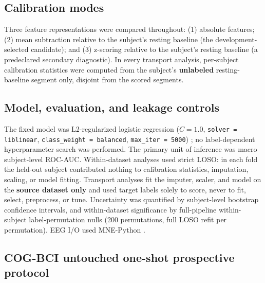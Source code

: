 \documentclass[11pt]{article}
\begin{document}
\subsection{Calibration modes}

Three feature representations were compared throughout: (1) absolute features;
(2) mean subtraction relative to the subject's resting baseline (the
development-selected candidate); and (3) z-scoring relative to the subject's
resting baseline (a predeclared secondary diagnostic). In every transport
analysis, per-subject calibration statistics were computed from the subject's
\textbf{unlabeled} resting-baseline segment only, disjoint from the scored
segments.

\subsection{Model, evaluation, and leakage controls}

The fixed model was L2-regularized logistic regression
($C = 1.0$, \texttt{solver = liblinear}, \texttt{class\_weight = balanced},
\texttt{max\_iter = 5000}) \cite{sklearn}; no label-dependent hyperparameter
search was performed. The primary unit of inference was macro subject-level
ROC-AUC. Within-dataset analyses used strict LOSO: in each fold the held-out
subject contributed nothing to calibration statistics, imputation, scaling, or
model fitting. Transport analyses fit the imputer, scaler, and model on the
\textbf{source dataset only} and used target labels solely to score, never to
fit, select, preprocess, or tune. Uncertainty was quantified by subject-level
bootstrap confidence intervals, and within-dataset significance by full-pipeline
within-subject label-permutation nulls (200 permutations, full LOSO refit per
permutation). EEG I/O used MNE-Python \cite{mne, gramfort2013}.

\subsection{COG-BCI untouched one-shot prospective protocol}
\end{document}
